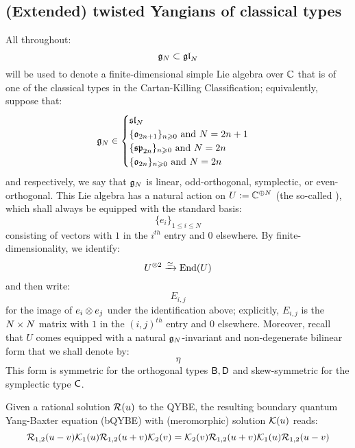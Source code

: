     \subsection{(Extended) twisted Yangians of classical types}
        All throughout:
            $$\mathfrak{g}_N \subset \mathfrak{gl}_N$$
        will be used to denote a finite-dimensional simple Lie algebra over $\mathbb{C}$ that is of one of the classical types in the Cartan-Killing Classification; equivalently, suppose that:
            $$
                \mathfrak{g}_N \in
                \begin{cases}
                    \text{$\mathfrak{sl}_N$}
                    \\
                    \text{$\{ \mathfrak{o}_{2n + 1} \}_{n \geqslant 0}$ and $N = 2n + 1$}
                    \\
                    \text{$\{ \mathfrak{sp}_{2n} \}_{n \geqslant 0}$ and $N = 2n$}
                    \\
                    \text{$\{ \mathfrak{o}_{2n} \}_{n \geqslant 0}$ and $N = 2n$}
                \end{cases}
            $$
        and respectively, we say that $\mathfrak{g}_N$ is linear, odd-orthogonal, symplectic, or even-orthogonal. This Lie algebra has a natural action on $U := \mathbb{C}^{\oplus N}$ (the so-called ), which shall always be equipped with the standard basis:
            $$\{e_i\}_{1 \leq i \leq N}$$
        consisting of vectors with $1$ in the $i^{th}$ entry and $0$ elsewhere. By finite-dimensionality, we identify:
            $$U^{\tensor 2} \xrightarrow[]{\cong} \End(U)$$
        and then write:
            $$E_{i, j}$$
        for the image of $e_i \tensor e_j$ under the identification above; explicitly, $E_{i, j}$ is the $N \x N$ matrix with $1$ in the $(i, j)^{th}$ entry and $0$ elsewhere. Moreover, recall that $U$ comes equipped with a natural $\mathfrak{g}_N$-invariant and non-degenerate bilinear form that we shall denote by:
            $$\eta$$
        This form is symmetric for the orthogonal types $\mathsf{B}, \mathsf{D}$ and skew-symmetric for the symplectic type $\mathsf{C}$.
    
        \begin{definition} \label{def: boundary_quantum_yang_baxter_equations}
            Given a rational solution $\mathcal{R}(u)$ to the QYBE, the resulting boundary quantum Yang-Baxter equation (bQYBE) with (meromorphic) solution $\mathcal{K}(u)$ reads:
                \begin{equation} \label{equation: boundary_quantum_yang_baxter_equations}
                    \mathcal{R}_{1, 2}(u - v) \mathcal{K}_1(u) \mathcal{R}_{1, 2}(u + v) \mathcal{K}_2(v) = \mathcal{K}_2(v) \mathcal{R}_{1, 2}(u + v) \mathcal{K}_1(u) \mathcal{R}_{1, 2}(u - v) 
                \end{equation}
        \end{definition}
    
